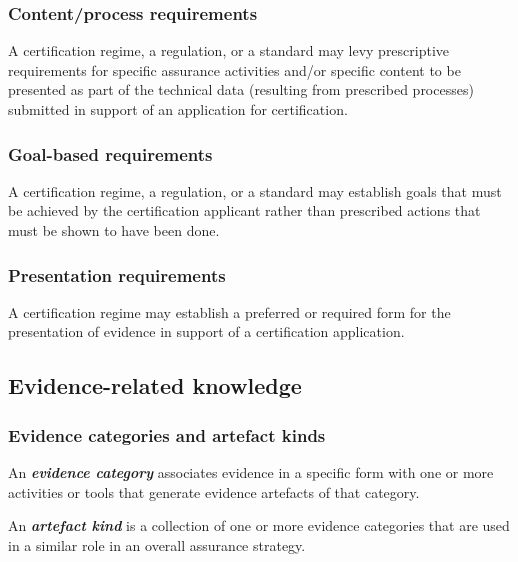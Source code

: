 \documentclass[12pt,twoside,a4paper]{article}
\begin{document}
\hypertarget{contentprocess-requirements}{%
\subsubsection{Content/process requirements}\label{contentprocess-requirements}}

A certification regime, a regulation, or a standard may levy prescriptive requirements for specific assurance activities and/or specific content to be presented as part of the technical data (resulting from prescribed processes) submitted in support of an application for certification.

\hypertarget{goal-based-requirements}{%
\subsubsection{Goal-based requirements}\label{goal-based-requirements}}

A certification regime, a regulation, or a standard may establish goals that must be achieved by the certification applicant rather than prescribed actions that must be shown to have been done.

\hypertarget{presentation-requirements}{%
\subsubsection{Presentation requirements}\label{presentation-requirements}}

A certification regime may establish a preferred or required form for the presentation of evidence in support of a certification application.

\hypertarget{evidence-related-knowledge}{%
\subsection{Evidence-related knowledge}\label{evidence-related-knowledge}}

\hypertarget{evidence-categories-and-artefact-kinds}{%
\subsubsection{Evidence categories and artefact kinds}\label{evidence-categories-and-artefact-kinds}}

An \emph{\textbf{evidence category}} associates evidence in a specific form with one or more activities or tools that generate evidence artefacts of that category.

An \emph{\textbf{artefact kind}} is a collection of one or more evidence categories that are used in a similar role in an overall assurance strategy.
\end{document}
